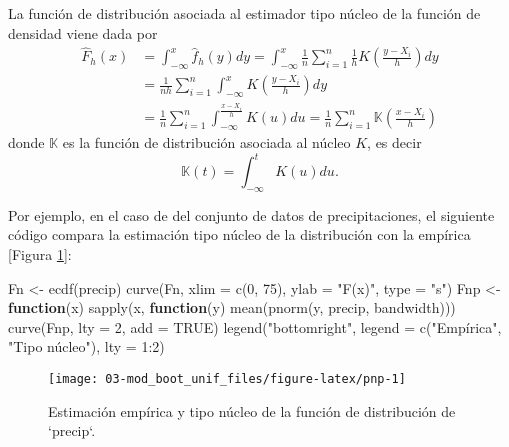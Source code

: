 \documentclass[
]{book}
\newenvironment{Shaded}{\begin{snugshade}}{\end{snugshade}}
\newcommand{\AttributeTok}[1]{\textcolor[rgb]{0.77,0.63,0.00}{#1}}
\newcommand{\ConstantTok}[1]{\textcolor[rgb]{0.00,0.00,0.00}{#1}}
\newcommand{\ControlFlowTok}[1]{\textcolor[rgb]{0.13,0.29,0.53}{\textbf{#1}}}
\newcommand{\DecValTok}[1]{\textcolor[rgb]{0.00,0.00,0.81}{#1}}
\newcommand{\FunctionTok}[1]{\textcolor[rgb]{0.00,0.00,0.00}{#1}}
\newcommand{\NormalTok}[1]{#1}
\newcommand{\OtherTok}[1]{\textcolor[rgb]{0.56,0.35,0.01}{#1}}
\newcommand{\SpecialCharTok}[1]{\textcolor[rgb]{0.00,0.00,0.00}{#1}}
\newcommand{\StringTok}[1]{\textcolor[rgb]{0.31,0.60,0.02}{#1}}
\theoremstyle{break}
\theoremstyle{definition}
\theoremstyle{definition}
\theoremstyle{definition}
\theoremstyle{definition}
\theoremstyle{remark}
\begin{document}
La función de distribución asociada al estimador tipo núcleo de la
función de densidad viene dada por
\[\begin{aligned}
\hat{F}_{h}\left( x \right) &= \int_{-\infty }^{x}\hat{f}_{h}\left( y \right) dy
=\int_{-\infty }^{x}\frac{1}{n}\sum_{i=1}^{n}\frac{1}{h}
K\left( \frac{y-X_i}{h} \right) dy \\
&= \frac{1}{nh}\sum_{i=1}^{n}\int_{-\infty }^{x}
K\left( \frac{y-X_i}{h} \right) dy \\
&= \frac{1}{n}\sum_{i=1}^{n}\int_{-\infty }^{\frac{x-X_i}{h}}K\left( u \right) du
=\frac{1}{n}\sum_{i=1}^{n}\mathbb{K}\left( \frac{x-X_i}{h} \right)
\end{aligned}\]
donde \(\mathbb{K}\) es la función de distribución
asociada al núcleo \(K\), es decir
\[\mathbb{K}\left( t \right) =\int_{-\infty }^{t}K\left(
u \right) du.\]

Por ejemplo, en el caso de del conjunto de datos de precipitaciones, el siguiente código compara la estimación tipo núcleo de la distribución con la empírica {[}Figura \ref{fig:pnp}{]}:

\begin{Shaded}
\begin{Highlighting}[]
\NormalTok{Fn }\OtherTok{\textless{}{-}} \FunctionTok{ecdf}\NormalTok{(precip)}
\FunctionTok{curve}\NormalTok{(Fn, }\AttributeTok{xlim =} \FunctionTok{c}\NormalTok{(}\DecValTok{0}\NormalTok{, }\DecValTok{75}\NormalTok{), }\AttributeTok{ylab =} \StringTok{"F(x)"}\NormalTok{, }\AttributeTok{type =} \StringTok{"s"}\NormalTok{)}
\NormalTok{Fnp }\OtherTok{\textless{}{-}} \ControlFlowTok{function}\NormalTok{(x) }\FunctionTok{sapply}\NormalTok{(x, }\ControlFlowTok{function}\NormalTok{(y) }\FunctionTok{mean}\NormalTok{(}\FunctionTok{pnorm}\NormalTok{(y, precip, bandwidth)))}
\FunctionTok{curve}\NormalTok{(Fnp, }\AttributeTok{lty =} \DecValTok{2}\NormalTok{, }\AttributeTok{add =} \ConstantTok{TRUE}\NormalTok{) }
\FunctionTok{legend}\NormalTok{(}\StringTok{"bottomright"}\NormalTok{, }\AttributeTok{legend =} \FunctionTok{c}\NormalTok{(}\StringTok{"Empírica"}\NormalTok{, }\StringTok{"Tipo núcleo"}\NormalTok{), }\AttributeTok{lty =} \DecValTok{1}\SpecialCharTok{:}\DecValTok{2}\NormalTok{)}
\end{Highlighting}
\end{Shaded}

\begin{figure}[!htb]

{\centering \texttt{[image: 03-mod\_boot\_unif\_files/figure-latex/pnp-1]} 

}

\caption{Estimación empírica y tipo núcleo de la función de distribución de `precip`. }\label{fig:pnp}
\end{figure}
\end{document}
